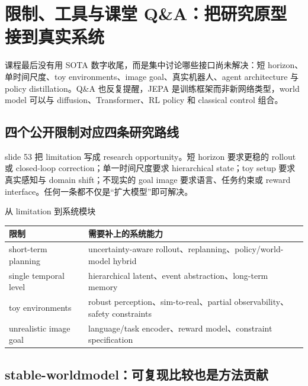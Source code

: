 \section{限制、工具与课堂 Q\&A：把研究原型接到真实系统}

课程最后没有用 SOTA 数字收尾，而是集中讨论哪些接口尚未解决：短 horizon、单时间尺度、toy environments、image goal、真实机器人、agent architecture 与 policy distillation。Q\&A 也反复提醒，JEPA 是训练框架而非新网络类型，world model 可以与 diffusion、Transformer、RL policy 和 classical control 组合。

\subsection{四个公开限制对应四条研究路线}

slide 53 把 limitation 写成 research opportunity。短 horizon 要求更稳的 rollout 或 closed-loop correction；单一时间尺度要求 hierarchical state；toy setup 要求真实感知与 domain shift；不现实的 goal image 要求语言、任务约束或 reward interface。任何一条都不仅是``扩大模型''即可解决。


\begin{knowledgebox}{从 limitation 到系统模块}
\begin{tabularx}{\textwidth}{L{0.24\textwidth} X}
\toprule
限制 & 需要补上的系统能力 \\
\midrule
short-term planning & uncertainty-aware rollout、replanning、policy/world-model hybrid \\
single temporal level & hierarchical latent、event abstraction、long-term memory \\
toy environments & robust perception、sim-to-real、partial observability、safety constraints \\
unrealistic image goal & language/task encoder、reward model、constraint specification \\
\bottomrule
\end{tabularx}
\end{knowledgebox}


\subsection{stable-worldmodel：可复现比较也是方法贡献}


